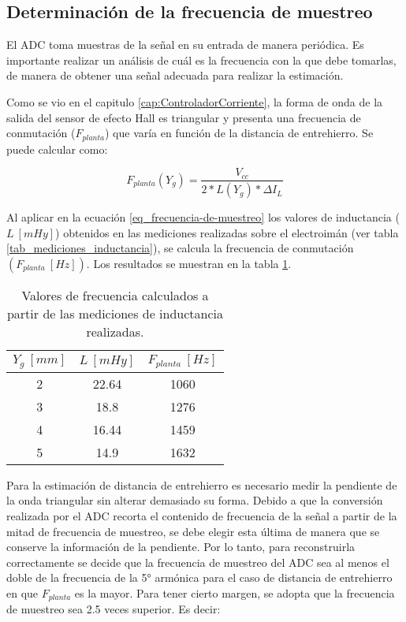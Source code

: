 \subsection{Determinación de la frecuencia de muestreo}

El ADC toma muestras de la señal en su entrada de manera periódica. Es importante realizar un análisis de cuál es la frecuencia con la que debe tomarlas, de manera de obtener una señal adecuada para realizar la estimación.

Como se vio en el capitulo \ref{cap:ControladorCorriente}, la forma de onda de la salida del sensor de efecto Hall es triangular y presenta una frecuencia de conmutación ($F_{planta}$) que varía en función de la distancia de entrehierro. Se puede calcular como:

\begin{equation} \label{eq_frecuencia-de-muestreo}
	F_{planta}(Y_g)=\frac{V_{cc}}{2 * L(Y_g) * \Delta I_L}
\end{equation}


Al aplicar en la ecuación \ref{eq_frecuencia-de-muestreo} los valores de inductancia ($L\:[mHy]$) obtenidos en las mediciones realizadas sobre el electroimán (ver tabla \ref{tab_mediciones_inductancia}), se calcula la frecuencia de conmutación  $(F_{planta}\:[Hz])$. Los resultados se muestran en la tabla \ref{frecuencias-calculadas}.



\begin{table}[H]
	\begin{center}
		\begin{tabular}{| c | c | c |}
			\hline
			$Y_g\:[mm]$ & $L\:[mHy]$ & $F_{planta}\:[Hz]$\\ \hline
			2 & 22.64 & 1060\\ \hline
			3 & 18.8 & 1276\\ \hline
			4 & 16.44 & 1459\\ \hline
			5 & 14.9 & 1632\\ \hline
		\end{tabular}
		\caption{Valores de frecuencia calculados a partir de las mediciones de inductancia realizadas.}
		\label{frecuencias-calculadas}
	\end{center}
\end{table}


 Para la estimación de distancia de entrehierro es necesario medir la pendiente de la onda triangular sin alterar demasiado su forma. Debido a que la conversión realizada por el ADC recorta el contenido de frecuencia de la señal a partir de la mitad de frecuencia de muestreo, se debe elegir esta última de manera que se conserve la información de la pendiente.  Por lo tanto, para reconstruirla correctamente se decide que la frecuencia de muestreo del ADC sea al menos el doble de la frecuencia de la 5° armónica para el caso de distancia de entrehierro en que $F_{planta}$ es la mayor. Para tener cierto margen, se adopta que la frecuencia de muestreo sea 2.5 veces superior. Es decir:

